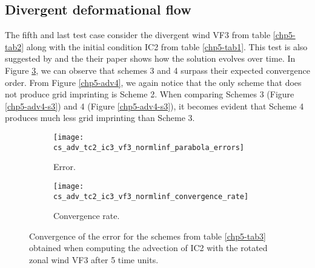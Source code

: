 \subsection{Divergent deformational flow}
The fifth and last test case consider the divergent wind VF3 from table \ref{chp5-tab2} along with
the initial condition IC2 from table \ref{chp5-tab1}.
This test is also suggested by \citet{nair:2010} and the their paper shows how the solution evolves over time.
In Figure \ref{chp5-error-adv4}, we can observe that schemes 3 and 4 surpass their expected convergence order.
From Figure \ref{chp5-adv4}, we again notice that the only scheme that does not produce grid imprinting is Scheme 2.
When comparing Schemes 3 (Figure \ref{chp5-adv4-s3}) and 4 (Figure \ref{chp5-adv4-s3}),
it becomes evident that Scheme 4 produces much less grid imprinting than Scheme 3.
\begin{figure}[!htb]
	\centering
	\begin{subfigure}{0.42\textwidth}
		\centering
		\texttt{[image: cs\_adv\_tc2\_ic3\_vf3\_normlinf\_parabola\_errors]}
		\caption{Error.\label{chp5-adv4-error}}
	\end{subfigure}
	\begin{subfigure}{0.42\textwidth}
		\centering
		\texttt{[image: cs\_adv\_tc2\_ic3\_vf3\_normlinf\_convergence\_rate]}
		\caption{Convergence rate.\label{chp5-adv4-cr}}
	\end{subfigure}
	\caption{Convergence of the error for the schemes from table \ref{chp5-tab3} obtained when computing the advection of IC2  with the rotated zonal wind VF3 after 5 time units.
		\label{chp5-error-adv4}}
\end{figure}


